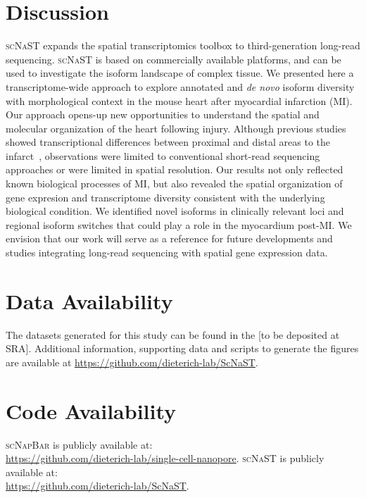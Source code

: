 \documentclass[utf8]{FrontiersinHarvard} %
\newcommand{\denovo}{\textit{de novo}\xspace}
\newcommand{\scn}{\textsc{scNapBar}\xspace}
\newcommand{\scnast}{\textsc{scNaST}\xspace}
\begin{document}
\section*{Discussion}
\scnast expands the spatial transcriptomics toolbox to third-generation long-read sequencing.
\scnast is based on commercially available platforms, and can be used to investigate the isoform landscape of complex tissue.
We presented here a transcriptome-wide approach to explore annotated and \denovo isoform diversity with morphological context in the mouse heart after myocardial infarction (MI).
Our approach opens-up new opportunities to understand the spatial and molecular organization of the heart following injury.
Although previous studies showed transcriptional differences between proximal and distal areas to the infarct~\citep{Duijvenboden2019:border_zone}, observations were limited to conventional short-read sequencing approaches or were limited in spatial resolution.
Our results not only reflected known biological processes of MI, but also revealed the spatial organization of gene expresion and transcriptome diversity consistent with the underlying biological condition.
We identified novel isoforms in clinically relevant loci and regional isoform switches that could play a role in the myocardium post-MI.
We envision that our work will serve as a reference for future developments and studies integrating long-read sequencing with spatial gene expression data.



\section*{Data Availability}
The datasets generated for this study can be found in the [to be deposited at SRA].
Additional information, supporting data and scripts to generate the figures are available at \url{https://github.com/dieterich-lab/ScNaST}.

\section*{Code Availability}
\scn is publicly available at:\\ \url{https://github.com/dieterich-lab/single-cell-nanopore}.
\scnast is publicly available at:\\ \url{https://github.com/dieterich-lab/ScNaST}.
\end{document}

